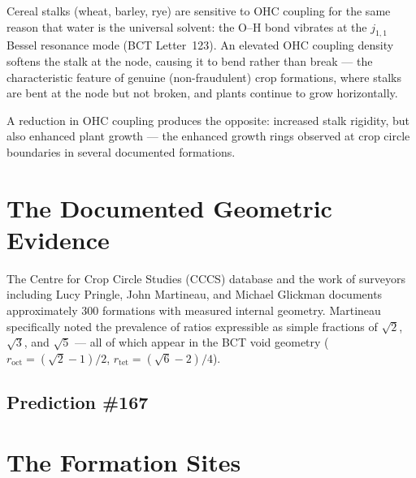 \documentclass[aps,prl,twocolumn,superscriptaddress,floatfix]{revtex4-2}
\begin{document}
Cereal stalks (wheat, barley, rye) are sensitive to OHC coupling
for the same reason that water is the universal solvent: the O--H
bond vibrates at the $j_{1,1}$ Bessel resonance mode (BCT
Letter~123). An elevated OHC coupling density softens the stalk at
the node, causing it to bend rather than break --- the characteristic
feature of genuine (non-fraudulent) crop formations, where stalks
are bent at the node but not broken, and plants continue to grow
horizontally.

A reduction in OHC coupling produces the opposite: increased stalk
rigidity, but also enhanced plant growth --- the enhanced growth
rings observed at crop circle boundaries in several documented
formations.

\section{The Documented Geometric Evidence}

The Centre for Crop Circle Studies (CCCS) database and the work of
surveyors including Lucy Pringle, John Martineau, and Michael Glickman
documents approximately 300 formations with measured internal geometry.
Martineau~\cite{Martineau1996} specifically noted the prevalence of
ratios expressible as simple fractions of $\sqrt{2}$, $\sqrt{3}$,
and $\sqrt{5}$ --- all of which appear in the BCT void geometry
($r_\mathrm{oct} = (\sqrt{2}-1)/2$, $r_\mathrm{tet} = (\sqrt{6}-2)/4$).

\subsection{Prediction \#167}

\noindent{}

\section{The Formation Sites}
\end{document}
